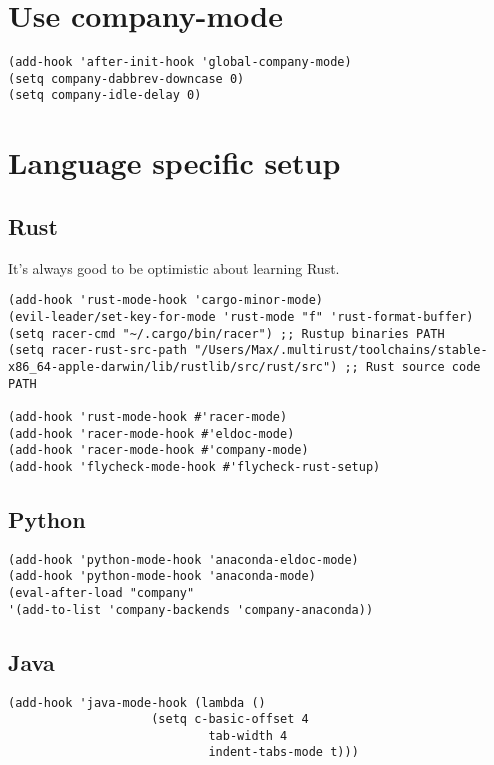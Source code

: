 \documentclass[11pt]{article}
\begin{document}
\section{Use company-mode}
\label{sec-12}
\begin{verbatim}
(add-hook 'after-init-hook 'global-company-mode)
(setq company-dabbrev-downcase 0)
(setq company-idle-delay 0)
\end{verbatim}


\section{Language specific setup}
\label{sec-13}
\subsection{Rust}
\label{sec-13-1}
It's always good to be optimistic about learning Rust.
\begin{verbatim}
(add-hook 'rust-mode-hook 'cargo-minor-mode)
(evil-leader/set-key-for-mode 'rust-mode "f" 'rust-format-buffer)
(setq racer-cmd "~/.cargo/bin/racer") ;; Rustup binaries PATH
(setq racer-rust-src-path "/Users/Max/.multirust/toolchains/stable-x86_64-apple-darwin/lib/rustlib/src/rust/src") ;; Rust source code PATH

(add-hook 'rust-mode-hook #'racer-mode)
(add-hook 'racer-mode-hook #'eldoc-mode)
(add-hook 'racer-mode-hook #'company-mode)
(add-hook 'flycheck-mode-hook #'flycheck-rust-setup)
\end{verbatim}
\subsection{Python}
\label{sec-13-2}
\begin{verbatim}
(add-hook 'python-mode-hook 'anaconda-eldoc-mode)
(add-hook 'python-mode-hook 'anaconda-mode)
(eval-after-load "company"
'(add-to-list 'company-backends 'company-anaconda))
\end{verbatim}
\subsection{Java}
\label{sec-13-3}
\begin{verbatim}
(add-hook 'java-mode-hook (lambda ()
                    (setq c-basic-offset 4
                            tab-width 4
                            indent-tabs-mode t)))
\end{verbatim}
\end{document}
